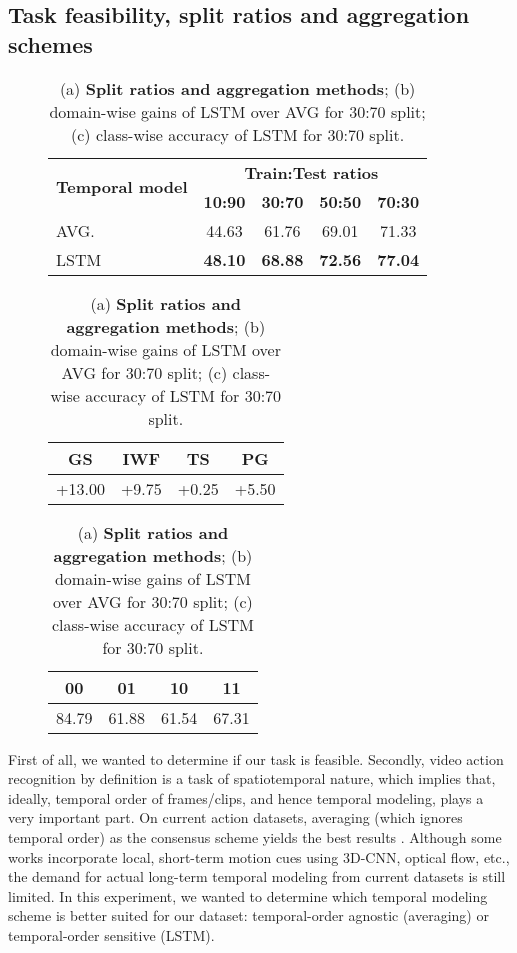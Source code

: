 \documentclass[final]{cvpr}
\begin{document}
\subsection{Task feasibility, split ratios and aggregation schemes}
\label{sec:exp_splitrat_aggre}
\begin{table}[]
\small
\centering
\begin{subfigure}[t]{\columnwidth}
\small
\centering
\begin{tabular}{@{}lcccc@{}}
\toprule
\multirow{2}{*}{\textbf{Temporal model}} & \multicolumn{4}{c}{\textbf{Train:Test ratios}} \\ & \textbf{10:90}   & \textbf{30:70}   & \textbf{50:50}   & \textbf{70:30 } \\ \midrule
AVG.                            & 44.63   & 61.76   & 69.01   & 71.33  \\
LSTM                            & \textbf{48.10}   & \textbf{68.88}   & \textbf{72.56}   & \textbf{77.04 } \\ \bottomrule
\end{tabular}
\caption{}
\label{tab:splitrat_aggre_a}
\end{subfigure}
\begin{subfigure}[t]{0.4\linewidth}
\small
\centering
\setlength\tabcolsep{4pt}
\begin{tabular}{@{}cccc@{}}
\toprule
\textbf{GS} & \textbf{IWF} & \textbf{TS} & \textbf{PG} \\ \midrule
+13.00       & +9.75         & +0.25        & +5.50        \\ \bottomrule
\end{tabular}
\caption{}
\label{tab:splitrat_aggre_b}
\end{subfigure}
\hfill
\begin{subfigure}[t]{0.5\linewidth}
\small
\centering
\setlength\tabcolsep{4pt}
\begin{tabular}{@{}cccc@{}}
\toprule
\textbf{00} & \textbf{01} & \textbf{10} & \textbf{11} \\ \midrule
84.79       & 61.88       & 61.54       & 67.31       \\ \bottomrule
\end{tabular}
\caption{}
\label{tab:splitrat_aggre_c}
\end{subfigure}
\caption{(a) \textbf{Split ratios and aggregation methods}; (b) domain-wise gains of LSTM over AVG for 30:70 split; (c) class-wise accuracy of LSTM for 30:70 split.}
\label{tab:splitrat_aggre}
\end{table} First of all, we wanted to determine if our task is feasible. Secondly, video action recognition by definition is a task of spatiotemporal nature, which implies that, ideally, temporal order of frames/clips, and hence temporal modeling, plays a very important part. On current action datasets, averaging (which ignores temporal order) as the consensus scheme yields the best results \cite{tsn, sports1m, mtlaqa}. Although some works incorporate local, short-term motion cues using 3D-CNN, optical flow, etc., the demand for actual long-term temporal modeling from current datasets is still limited. In this experiment, we wanted to determine which temporal modeling scheme is better suited for our dataset: temporal-order agnostic (averaging) or temporal-order sensitive (LSTM).
\end{document}
